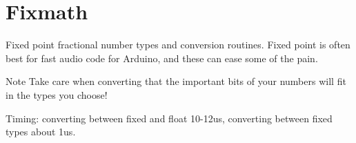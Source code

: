 \hypertarget{group__fixmath}{}\section{Fixmath}
\label{group__fixmath}
Fixed point fractional number types and conversion routines. Fixed point is often best for fast audio code for Arduino, and these can ease some of the pain. \begin{DoxyNote}{Note}
Take care when converting that the important bits of your numbers will fit in the types you choose! 

Timing\+: converting between fixed and float 10-\/12us, converting between fixed types about 1us. 
\end{DoxyNote}
